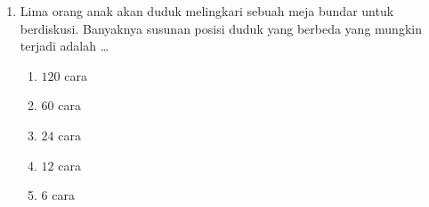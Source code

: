 \documentclass[12pt,a4paper]{article}
\begin{document}
\begin{enumerate}[leftmargin=*]
\item Lima orang anak akan duduk melingkari sebuah meja bundar untuk berdiskusi. Banyaknya susunan posisi duduk yang berbeda yang mungkin terjadi adalah \dots
    \begin{enumerate}[label=\alph*.]
        \item $120$ cara
        \item $60$ cara
        \item $24$ cara
        \item $12$ cara
        \item $6$ cara
    \end{enumerate}
\end{enumerate}
\end{document}
